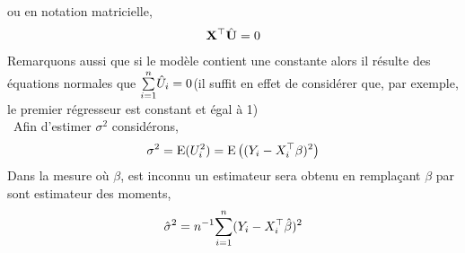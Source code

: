 ou en notation matricielle,
\begin{align}
\mathbf X^\top\hat{\mathbf U} = 0
\label{eq11}
\end{align}
Remarquons aussi que si le modèle contient une constante alors il résulte des équations normales que $\underset{i=1}{\overset{n}{\sum}}\hat{U}_i = 0$(il suffit en effet de considérer que, par exemple, le premier régresseur est constant et égal à 1)\\\
Afin d'estimer $\sigma^2$ considérons,
\begin{align*}
\sigma^2 = \operatorname{E}(U_i^2)=\operatorname{E}\left((Y_i - X_i^\top\beta)^2\right)
\end{align*}
Dans la mesure où $\beta$, est inconnu un estimateur  sera obtenu en remplaçant $\beta$ par sont estimateur des moments,
\begin{align}
\hat{\sigma}^2 = n^{-1}\underset{i=1}{\overset{n}{\sum}}(Y_i-X_i^\top\hat{\beta})^2
\label{eq12}
\end{align}

